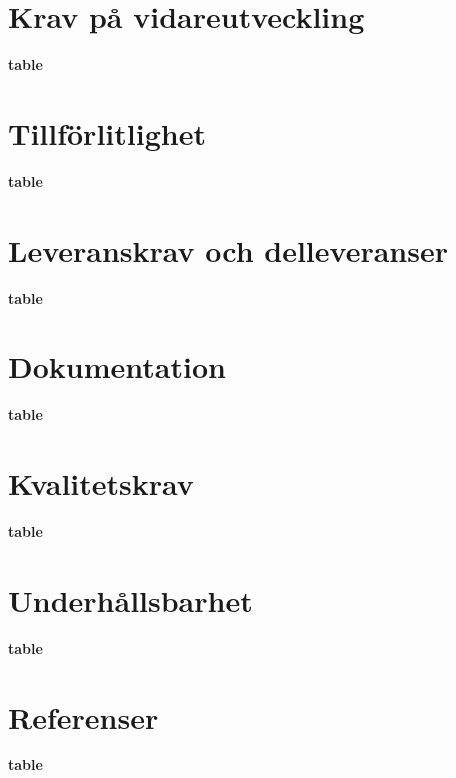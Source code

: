 \documentclass[a4paper,titlepage,12pt]{article}
\begin{document}
	\section{Krav på vidareutveckling}
	\textbf{table}
	\section{Tillförlitlighet}
	\textbf{table}
	\section{Leveranskrav och  delleveranser}
	\textbf{table}
	\section{Dokumentation}
	\textbf{table}
	\section{Kvalitetskrav}
	\textbf{table}
	\section{Underhållsbarhet}
	\textbf{table}
	\section{Referenser}
	\textbf{table}
\end{document}
